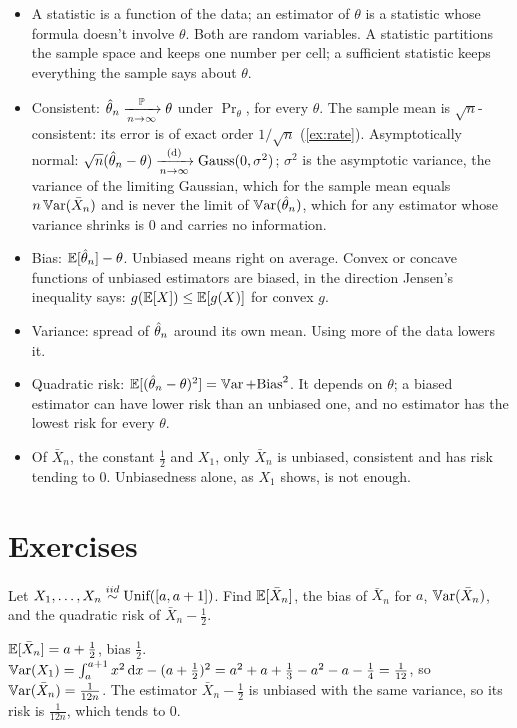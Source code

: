 \begin{itemize}[nosep]
\item A statistic is a function of the data; an estimator of $\theta$ is a statistic whose formula doesn't involve $\theta$. Both are random variables. A statistic partitions the sample space and keeps one number per cell; a sufficient statistic keeps everything the sample says about $\theta$.
\item Consistent: $\hat{\theta}_n \xrightarrow [n \to \infty ]{\mathbb{P}} \theta$ under $\Pr_\theta$, for every $\theta$. The sample mean is $\sqrt{n}$-consistent: its error is of exact order $1/\sqrt{n}$ (\cref{ex:rate}). Asymptotically normal: $\sqrt{n}(\hat{\theta}_n - \theta) \xrightarrow [n \to \infty ]{\text{(d)}} \text{Gauss}(0, \sigma^2)$; $\sigma^2$ is the asymptotic variance, the variance of the limiting Gaussian, which for the sample mean equals $n \operatorname*{\mathbb{V}\text{ar}}(\bar{X}_n)$ and is never the limit of $\operatorname*{\mathbb{V}\text{ar}}(\hat{\theta}_n)$, which for any estimator whose variance shrinks is $0$ and carries no information.
\item Bias: $\operatorname*{\mathbb{E}}[\hat{\theta}_n] - \theta$. Unbiased means right on average. Convex or concave functions of unbiased estimators are biased, in the direction Jensen's inequality says: $g(\operatorname*{\mathbb{E}}[X]) \leq \operatorname*{\mathbb{E}}[g(X)]$ for convex $g$.
\item Variance: spread of $\hat{\theta}_n$ around its own mean. Using more of the data lowers it.
\item Quadratic risk: $\operatorname*{\mathbb{E}}[(\hat{\theta}_n - \theta)^2] = \operatorname*{\mathbb{V}\text{ar}} + \text{Bias}^2$. It depends on $\theta$; a biased estimator can have lower risk than an unbiased one, and no estimator has the lowest risk for every $\theta$.
\item Of $\bar{X}_n$, the constant $\frac12$ and $X_1$, only $\bar{X}_n$ is unbiased, consistent and has risk tending to $0$. Unbiasedness alone, as $X_1$ shows, is not enough.
\end{itemize}

\section{Exercises}
\label{sec:est-exercises}

\begin{exercise}
Let $X_1, \ldots, X_n \stackrel{iid}{\sim} \text{Unif}([a, a+1])$. Find $\operatorname*{\mathbb{E}}[\bar{X}_n]$, the bias of $\bar{X}_n$ for $a$, $\operatorname*{\mathbb{V}\text{ar}}(\bar{X}_n)$, and the quadratic risk of $\bar{X}_n - \frac12$.
\end{exercise}
\begin{solution}
$\operatorname*{\mathbb{E}}[\bar{X}_n] = a + \frac12$, bias $\frac12$. $\operatorname*{\mathbb{V}\text{ar}}(X_1) = \int_a^{a+1} x^2 \, \mathrm{d}x - (a + \frac12)^2 = a^2 + a + \frac13 - a^2 - a - \frac14 = \frac{1}{12}$, so $\operatorname*{\mathbb{V}\text{ar}}(\bar{X}_n) = \frac{1}{12n}$. The estimator $\bar{X}_n - \frac12$ is unbiased with the same variance, so its risk is $\frac{1}{12n}$, which tends to $0$.
\end{solution}

